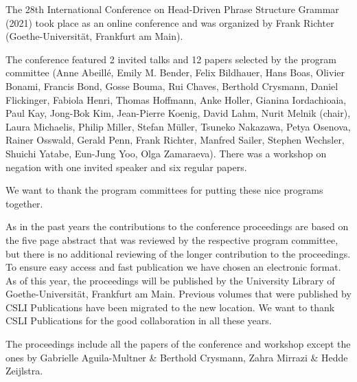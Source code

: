The 28th International Conference on Head-Driven Phrase Structure Grammar (2021) took place as an
online conference and was organized by Frank Richter (Goethe-Universität, Frankfurt am Main).


The conference featured 2 invited talks and 12 papers selected by the program committee 
(Anne Abeillé, 
    Emily M. Bender, 
    Felix Bildhauer, 
    Hans Boas, 
    Olivier Bonami, 
    Francis Bond, 
    Gosse Bouma, 
    Rui Chaves, 
    Berthold Crysmann, 
    Daniel Flickinger, 
    Fabiola Henri, 
    Thomas Hoffmann, 
    Anke Holler, 
    Gianina Iordachioaia, 
    Paul Kay, 
    Jong-Bok Kim, 
    Jean-Pierre Koenig, 
    David Lahm, 
    Nurit Melnik (chair),
    Laura Michaelis, 
    Philip Miller, 
    Stefan Müller, 
    Tsuneko Nakazawa, 
    Petya Osenova, 
    Rainer Osswald, 
    Gerald Penn, 
    Frank Richter, 
    Manfred Sailer, 
    Stephen Wechsler, 
    Shuichi Yatabe,
    Eun-Jung Yoo, 
    Olga Zamaraeva). There was a workshop on negation with one invited speaker and six regular papers.


We want to thank the program committees for putting these nice programs together.

 

As in the past years the contributions to the conference proceedings are based on the five page abstract
that was reviewed by the respective 
program committee, but there is no additional reviewing of the
longer contribution to the proceedings. To ensure easy access and fast publication we have chosen an
electronic format. As of this year, the proceedings will be published by the University Library of
Goethe-Universität, Frankfurt am Main. Previous volumes that were published by CSLI Publications
have been migrated to the new location. We want to thank CSLI Publications for the good
collaboration in all these years.

The proceedings include all the papers of the conference and workshop except the ones by 
Gabrielle Aguila-Multner \& Berthold Crysmann, Zahra Mirrazi \& Hedde Zeijlstra.


